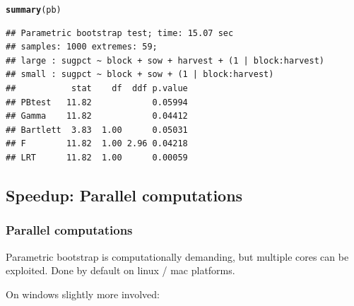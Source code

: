 \documentclass[compress]{beamer}\usepackage[]{graphicx}\usepackage[]{color}
\makeatletter
\newcommand{\hlstd}[1]{\textcolor[rgb]{0.345,0.345,0.345}{#1}}%
\newcommand{\hlkwd}[1]{\textcolor[rgb]{0.737,0.353,0.396}{\textbf{#1}}}%
\newenvironment{kframe}{%
 \def\at@end@of@kframe{}%
 \ifinner\ifhmode%
  \def\at@end@of@kframe{\end{minipage}}%
  \begin{minipage}{\columnwidth}%
 \fi\fi%
 \def\FrameCommand##1{\hskip\@totalleftmargin \hskip-\fboxsep
 \colorbox{shadecolor}{##1}\hskip-\fboxsep
     \hskip-\linewidth \hskip-\@totalleftmargin \hskip\columnwidth}%
 \MakeFramed {\advance\hsize-\width
   \@totalleftmargin\z@ \linewidth\hsize
   \@setminipage}}%
 {\par\unskip\endMakeFramed%
 \at@end@of@kframe}
\newenvironment{knitrout}{}{} %
\newenvironment{sframe}
{\begin{frame} [containsverbatim] }
  {\end{frame}}
\makeatother
\begin{document}
\begin{sframe}
\begin{knitrout}\scriptsize
{}\color{fgcolor}\begin{kframe}
\begin{alltt}
\hlkwd{summary}\hlstd{(pb)}
\end{alltt}
\begin{verbatim}
## Parametric bootstrap test; time: 15.07 sec
## samples: 1000 extremes: 59;
## large : sugpct ~ block + sow + harvest + (1 | block:harvest)
## small : sugpct ~ block + sow + (1 | block:harvest)
##           stat    df  ddf p.value
## PBtest   11.82            0.05994
## Gamma    11.82            0.04412
## Bartlett  3.83  1.00      0.05031
## F        11.82  1.00 2.96 0.04218
## LRT      11.82  1.00      0.00059
\end{verbatim}
\end{kframe}
\end{knitrout}
  \end{sframe}


\subsection{Speedup: Parallel computations}

\begin{sframe}
\frametitle{Parallel computations}

Parametric bootstrap is computationally demanding, but multiple cores can be exploited. Done by default on linux / mac platforms. 

On windows slightly more involved:

  


\end{sframe}
\end{document}
